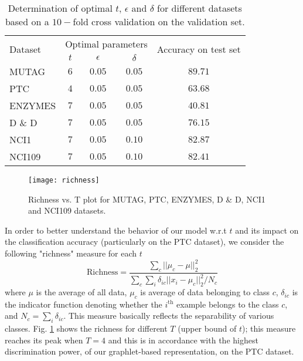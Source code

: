 \documentclass[journal]{IEEEtran}
\theoremstyle{definition}
\newcommand{\fig}[1]{Fig. \ref{#1}}
\begin{document}
\begin{table}[!ht]
\begin{center}
\caption{Determination of optimal $t$, $\epsilon$ and $\delta$ for different datasets based on a $10-$fold cross validation on the validation set.}
\label{tab:param-cross-valid}
\begin{tabular}{|l|c|c|c|c|}
\hline
\multirow{2}{*}{Dataset} & \multicolumn{3}{c|}{Optimal parameters} & \multirow{2}{*}{Accuracy on test set} \\
\cline{2-4}
 & $t$ & $\epsilon$ & $\delta$ & \\
\hline
MUTAG   & $6$ & $0.05$ & $0.05$ & $89.71$ \\
PTC     & $4$ & $0.05$ & $0.05$ & $63.68$ \\
ENZYMES & $7$ & $0.05$ & $0.05$ & $40.81$ \\
D \& D  & $7$ & $0.05$ & $0.05$ & $76.15$ \\
NCI1    & $7$ & $0.05$ & $0.10$ & $82.87$ \\
NCI109  & $7$ & $0.05$ & $0.10$ & $82.41$ \\
\hline
\end{tabular}
\end{center}
\end{table}

\begin{figure}
\begin{center}
\texttt{[image: richness]}
\caption{Richness vs. T plot for MUTAG, PTC, ENZYMES, D \& D, NCI1 and NCI109 datasets.}
\label{fig:richness}
\end{center}
\end{figure}

\noindent In order to better understand the behavior of our model w.r.t $t$ and its impact on the classification accuracy (particularly on the PTC dataset), we consider the following "richness" measure for each $t$
\begin{equation*}
\text{Richness}=\frac{\sum_c ||\mu_c - \mu||_2^2}{\sum_c \sum_i \delta_{ic} ||x_i-\mu_c||_2^2/N_c}
\end{equation*}
where $\mu$ is the average of all data, $\mu_c$ is average of data belonging to class $c$, $\delta_{ic}$ is the indicator function denoting whether the $i^\text{th}$ example belongs to the class $c$, and $N_c=\sum_i\delta_{ic}$. This measure basically reflects the separability of various classes. \fig{fig:richness} shows the richness  for different $T$ (upper bound of $t$); this measure reaches its peak when $T=4$ and this is in accordance with the highest discrimination power, of our graphlet-based representation, on the PTC dataset.
\end{document}
